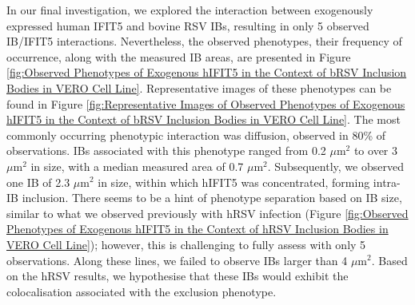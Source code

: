 In our final investigation, we explored the interaction between exogenously expressed human IFIT5 and bovine RSV IBs, resulting in only 5 observed IB/IFIT5 interactions. Nevertheless, the observed phenotypes, their frequency of occurrence, along with the measured IB areas, are presented in Figure \ref{fig:Observed Phenotypes of Exogenous hIFIT5 in the Context of bRSV Inclusion Bodies in VERO Cell Line}. Representative images of these phenotypes can be found in Figure \ref{fig:Representative Images of Observed Phenotypes of Exogenous hIFIT5 in the Context of bRSV Inclusion Bodies in VERO Cell Line}. The most commonly occurring phenotypic interaction was diffusion, observed in 80\% of observations. IBs associated with this phenotype ranged from 0.2 \(\mu \mbox{m}^2\) to over 3 \(\mu \mbox{m}^2\) in size, with a median measured area of 0.7 \(\mu \mbox{m}^2\). Subsequently, we observed one IB of 2.3 \(\mu \mbox{m}^2\) in size, within which hIFIT5 was concentrated, forming intra-IB inclusion. There seems to be a hint of phenotype separation based on IB size, similar to what we observed previously with hRSV infection (Figure \ref{fig:Observed Phenotypes of Exogenous hIFIT5 in the Context of hRSV Inclusion Bodies in VERO Cell Line}); however, this is challenging to fully assess with only 5 observations. Along these lines, we failed to observe IBs larger than 4 \(\mu \mbox{m}^2\). Based on the hRSV results, we hypothesise that these IBs would exhibit the colocalisation associated with the exclusion phenotype.

